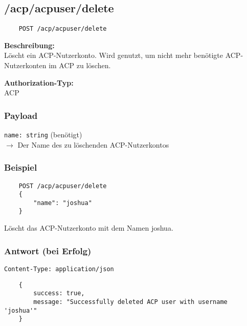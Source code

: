 \subsection{/acp/acpuser/delete}

\begin{lstlisting}
    POST /acp/acpuser/delete
\end{lstlisting}

\textbf{Beschreibung:} \\
Löscht ein ACP-Nutzerkonto. Wird genutzt, um nicht mehr benötigte ACP-Nutzerkonten im ACP zu löschen.

\textbf{Authorization-Typ:} \\
ACP

\subsubsection{Payload}

\lstinline{name: string} (benötigt) \\
$\rightarrow$ Der Name des zu löschenden ACP-Nutzerkontos

\subsubsection{Beispiel}

\begin{lstlisting}
    POST /acp/acpuser/delete
    {
        "name": "joshua"
    }
\end{lstlisting}

Löscht das ACP-Nutzerkonto mit dem Namen \glqq joshua\grqq.

\subsubsection{Antwort (bei Erfolg)}

\lstinline{Content-Type: application/json}
\begin{lstlisting}
    {
        success: true, 
        message: "Successfully deleted ACP user with username 'joshua'"
    }
\end{lstlisting}
